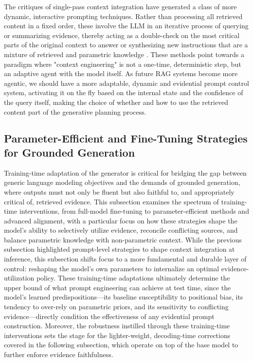 \documentclass[11pt,a4paper]{article}
\begin{document}
The critiques of single-pass context integration have generated a class of more dynamic, interactive prompting techniques. Rather than processing all retrieved content in a fixed order, these involve the LLM in an iterative process of querying or summarizing evidence, thereby acting as a double-check on the most critical parts of the original context to answer \cite{arxiv:2410.19572v5} or synthesizing new instructions that are a mixture of retrieved and parametric knowledge \cite{arxiv:1809.05296v5}. These methods point towards a paradigm where "context engineering" is not a one-time, deterministic step, but an adaptive agent with the model itself. As future RAG systems become more agentic, we should have a more adaptable, dynamic and evidential prompt control system, activating it on the fly based on the internal state and the confidence of the query itself, making the choice of whether and how to use the retrieved content part of the generative planning process.


\subsection{Parameter-Efficient and Fine-Tuning Strategies for Grounded Generation}


Training-time adaptation of the generator is critical for bridging the gap between generic language modeling objectives and the demands of grounded generation, where outputs must not only be fluent but also faithful to, and appropriately critical of, retrieved evidence. This subsection examines the spectrum of training-time interventions, from full-model fine-tuning to parameter-efficient methods and advanced alignment, with a particular focus on how these strategies shape the model's ability to selectively utilize evidence, reconcile conflicting sources, and balance parametric knowledge with non-parametric context. While the previous subsection highlighted prompt-level strategies to shape context integration at inference, this subsection shifts focus to a more fundamental and durable layer of control: reshaping the model's own parameters to internalize an optimal evidence-utilization policy. These training-time adaptations ultimately determine the upper bound of what prompt engineering can achieve at test time, since the model's learned predispositions---its baseline susceptibility to positional bias, its tendency to over-rely on parametric priors, and its sensitivity to conflicting evidence---directly condition the effectiveness of any evidential prompt construction. Moreover, the robustness instilled through these training-time interventions sets the stage for the lighter-weight, decoding-time corrections covered in the following subsection, which operate on top of the base model to further enforce evidence faithfulness.
\end{document}
